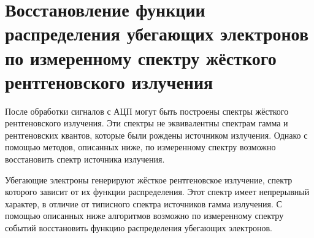 \chapter{Восстановление функции распределения убегающих электронов по измеренному спектру жёсткого рентгеновского излучения}
\label{sec:deconvolution}

После обработки сигналов с АЦП  могут быть построены спектры жёсткого рентгеновского излучения. Эти спектры не эквивалентны спектрам гамма и рентгеновских квантов, которые были рождены источником излучения. Однако с помощью методов, описанных ниже, по измеренному спектру возможно восстановить спектр источника излучения. 

Убегающие электроны генерируют жёсткое рентгеновское излучение, спектр которого зависит от их функции распределения. Этот спектр имеет непрерывный характер, в отличие от типисного спектра источников гамма излучения. С помощью описанных ниже алгоритмов возможно по измеренному спектру событий восстановить функцию распределения убегающих электронов.



